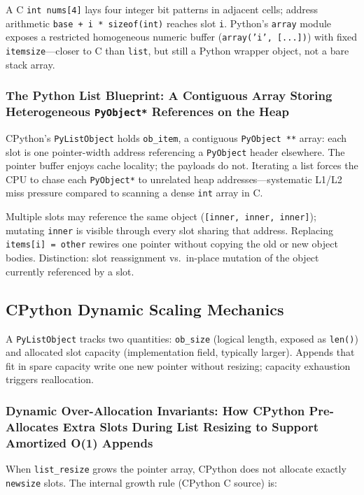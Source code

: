 \documentclass[a4paper,twoside]{report}
\begin{document}
A C \texttt{int nums[4]} lays four integer bit patterns in adjacent cells; address arithmetic \texttt{base + i * sizeof(int)} reaches slot \texttt{i}. Python's \texttt{array} module exposes a restricted homogeneous numeric buffer (\texttt{array('i', [...])}) with fixed \texttt{itemsize}---closer to C than \texttt{list}, but still a Python wrapper object, not a bare stack array.

\subsubsection{The Python List Blueprint: A Contiguous Array Storing Heterogeneous \texttt{PyObject*} References on the Heap}

CPython's \texttt{PyListObject} holds \texttt{ob\_item}, a contiguous \texttt{PyObject **} array: each slot is one pointer-width address referencing a \texttt{PyObject} header elsewhere. The pointer buffer enjoys cache locality; the payloads do not. Iterating a list forces the CPU to chase each \texttt{PyObject*} to unrelated heap addresses---systematic L1/L2 miss pressure compared to scanning a dense \texttt{int} array in C.

Multiple slots may reference the same object (\texttt{[inner, inner, inner]}); mutating \texttt{inner} is visible through every slot sharing that address. Replacing \texttt{items[i] = other} rewires one pointer without copying the old or new object bodies. Distinction: slot reassignment vs.\ in-place mutation of the object currently referenced by a slot.


\subsection{CPython Dynamic Scaling Mechanics}

A \texttt{PyListObject} tracks two quantities: \texttt{ob\_size} (logical length, exposed as \texttt{len()}) and allocated slot capacity (implementation field, typically larger). Appends that fit in spare capacity write one new pointer without resizing; capacity exhaustion triggers reallocation.

\subsubsection{Dynamic Over-Allocation Invariants: How CPython Pre-Allocates Extra Slots During List Resizing to Support Amortized O(1) Appends}

When \texttt{list\_resize} grows the pointer array, CPython does not allocate exactly \texttt{newsize} slots. The internal growth rule (CPython C source) is:
\end{document}
